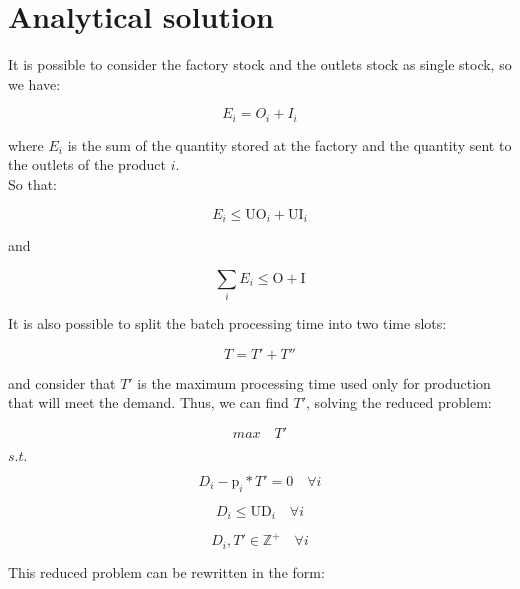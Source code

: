 \documentclass[authoryear,preprint,12pt]{elsarticle}
\begin{document}
\section{Analytical solution}
\label{sec:analyticalSol}

It is possible to consider the factory stock and the outlets stock as single stock, so we have:

\begin{equation}
E_i = O_i + I_i
\end{equation}

where $E_i$ is the sum of the quantity stored at the factory and the quantity sent to the outlets of the product $i$. \\

So that:

\begin{equation}
E_i \leq \textrm{UO}_i + \textrm{UI}_i
\end{equation}

and

\begin{equation}
\sum_i {E_i} \leq \textrm{O} + \textrm{I}
\end{equation}


It is also possible to split the batch processing time into two time slots:

\begin{equation}
T = T' + T''
\end{equation}

and consider that $T'$ is the maximum processing time used only for production that will meet the demand. Thus, we can find $T'$, solving the reduced problem:

\begin{equation}
max \quad T'
\end{equation}

$s.t.$

\begin{equation}
D_i - \textrm{p}_i * T'  = 0 \quad \forall i
\end{equation}

\begin{equation}
D_i \leq \textrm{UD}_i \quad \forall i
\end{equation}

\begin{equation}
D_i, T' \in  \mathbb{Z}^+ \quad \forall i
\end{equation}

This reduced problem can be rewritten in the form:
\end{document}
